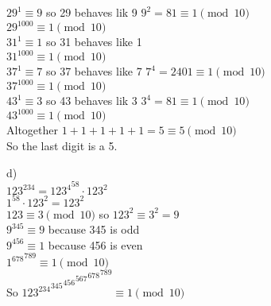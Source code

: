 $29^{1} \equiv 9$ so 29 behaves lik 9 $9^{2} = 81 \equiv 1 \pmod{10}$\\
$29^{1000} \equiv 1 \pmod{10}$\\

$31^{1} \equiv 1$ so 31 behaves like 1\\
$31^{1000} \equiv 1 \pmod{10}$\\

$37^{1} \equiv 7$ so 37 behaves like 7 $7^{4} = 2401 \equiv 1 \pmod{10}$\\
$37^{1000} \equiv 1 \pmod{10}$\\

$43^{1} \equiv 3$ so 43 behaves lik 3 $3^{4} = 81 \equiv 1 \pmod{10}$\\
$43^{1000} \equiv 1 \pmod{10}$\\


Altogether $1 + 1 + 1 + 1 + 1 = 5 \equiv 5 \pmod{10}$\\
So the last digit is a 5.

d)\\
${123^{234}} = {123^{4}}^{58} \cdot 123^{2}$\\
$1^{58} \cdot 123^{2} = 123^{2}$\\
$123 \equiv 3 \pmod{10}$ so $123^{2} \equiv 3^{2} = 9$\\
$9^{345} \equiv 9$ because 345 is odd \\
$9^{456} \equiv 1$ because 456 is even \\
${1^{678}}^{789} \equiv 1 \pmod{10}$\\



So ${{{{{123^{234}}^{345}}^{456}}^{567}}^{678}}^{789} \equiv 1 \pmod{10}$\\


